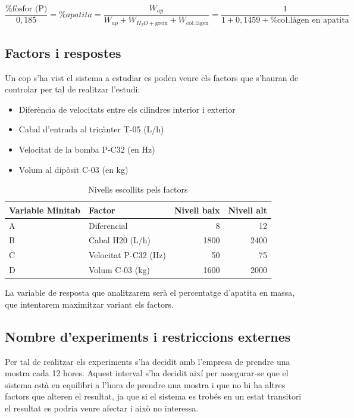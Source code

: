 \documentclass[a4paper]{article}
\begin{document}
$$
\frac{\% \text{fòsfor (P)}}{0,185} = \% apatita = 
\frac{W_{ap}}{W_{ap} + W_{H_2O + \text{greix}} + W_{\text{co\l.làgen}}} =
\frac{1}{1 + 0,1459 + \% \text{co\l.làgen en apatita}}
$$

\subsection{Factors i respostes}

Un cop s'ha vist el sistema a estudiar es poden veure els factors que s'hauran de controlar per tal de realitzar l'estudi:

\begin{itemize}
	\item Diferència de velocitats entre els cilindres interior i exterior
	\item Cabal d'entrada al tricànter T-05 (L/h)
	\item Velocitat de la bomba P-C32 (en Hz)
	\item Volum al dipòsit C-03 (en kg)
\end{itemize}

\begin{table}[H]
	\centering
	\begin{tabular}{ l | l | r | r }
		\rowcolor{gray!60}
		Variable Minitab & Factor & Nivell baix & Nivell alt \\ \hline
		A & Diferencial & 8 & 12 \\
		B & Cabal H20 (L/h)& 1800 & 2400 \\
		C & Velocitat P-C32 (Hz) & 50 & 75 \\
		D & Volum C-03 (kg) & 1600 & 2000 \\
	\end{tabular}
	\caption{Nivells escollits pels factors}
\end{table}

La variable de resposta que analitzarem serà el percentatge d'apatita en massa, que intentarem maximitzar variant els factors.


\subsection{Nombre d'experiments i restriccions externes}
Per tal de realitzar els experiments s'ha decidit amb l'empresa de prendre una mostra cada 12 hores. Aquest interval s'ha decidit així per assegurar-se que el sistema està en equilibri a l'hora de prendre una mostra i que no hi ha altres factors que alteren el resultat, ja que si el sistema es trobés en un estat transitori el resultat es podria veure afectar i això no interessa.
\end{document}
